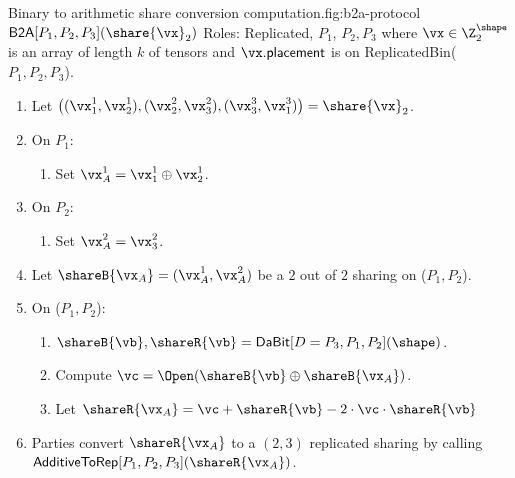 \begin{Boxfig}{Binary to arithmetic share conversion computation.}{fig:b2a-protocol}
  {$\mathsf{B2A}[P_1, P_2, P_3](\share{\vx}_2)$}
  Roles: Replicated, $P_1$, $P_2, P_3$ where $\vx \in \Z_{2}^\shape$ is an array of length $k$
  of tensors and
  $\vx.\mathsf{placement}$ is on ReplicatedBin($P_1, P_2, P_3$).

  \begin{enumerate}
  \item Let $\left( (\vx_1^1, \vx_2^1), (\vx_2^2, \vx_3^2), (\vx_3^3, \vx_1^3) \right) = \share{\vx}_2$.
  \item On $P_1$:
  \begin{enumerate}
  \item Set $\vx_A^1 = \vx_1^1 \oplus \vx_2^1$.
  \end{enumerate}
  \item On $P_2$:
  \begin{enumerate}
      \item Set $\vx_A^2 = \vx_3^2$.
  \end{enumerate}
  \item Let $\shareB{\vx_A} = (\vx_A^1, \vx_A^2)$ be a $2$ out of $2$ sharing on ($P_1, P_2$).
  \item On ($P_1, P_2$):
  \begin{enumerate}
      \item $\shareB{\vb}, \shareR{\vb} = \textsf{DaBit}[D=P_3, P_1, P_2](\shape)$.
      \item Compute $\vc = \Open( \shareB{\vb} \oplus \shareB{\vx_A})$.
      \item Let $\shareR{\vx_A} = \vc + \shareR{\vb} - 2 \cdot \vc \cdot \shareR{\vb}$
  \end{enumerate}
  \item Parties convert $\shareR{\vx_A}$ to a $(2,3)$ replicated sharing by calling
  $\textsf{AdditiveToRep}[P_1,P_2,P_3](\shareR{\vx_A})$.
\end{enumerate}

\end{Boxfig}

